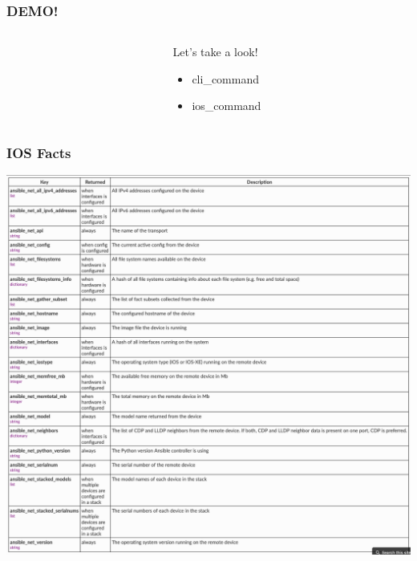\documentclass{beamer}
\begin{document}
\begin{frame}
  \frametitle{DEMO!}
  \begin{columns}
  \begin{column}{0.3\textwidth}
    \Huge
    \begin{center}
      \faDesktop 
      \hspace{.5cm}
      \faRocket     
    \end{center}
  \end{column}
  \begin{column}{0.7\textwidth}
    \huge 
    Let's take a look!
    \begin{itemize}
      \item cli\_command
      \item ios\_command
    \end{itemize}
  \end{column}
\end{columns}
\end{frame}

\begin{frame}
  \frametitle{IOS Facts}
  \includegraphics[width=\textwidth]{assets/ios_facts.png}
  

\end{frame}
\end{document}
